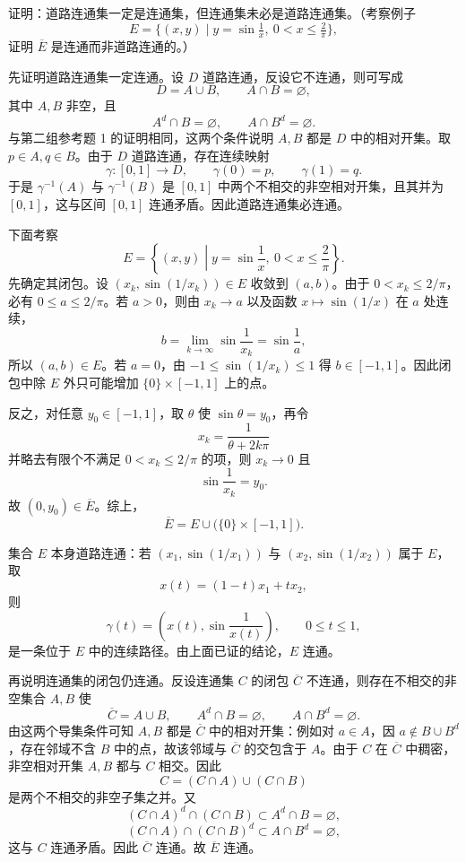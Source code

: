\begin{xreferenceproblem}[5]
证明：道路连通集一定是连通集，但连通集未必是道路连通集。（考察例子
  \[
    E=\{(x,y)\mid y=\sin\tfrac1x,\ 0<x\leq\tfrac2\pi\},
  \]
  证明 $\overline E$ 是连通而非道路连通的。）
\end{xreferenceproblem}
\begin{xsolution}
先证明道路连通集一定连通。设 $D$ 道路连通，反设它不连通，则可写成
\[
  D=A\cup B,
  \qquad A\cap B=\varnothing,
\]
其中 $A,B$ 非空，且
\[
  A^d\cap B=\varnothing,
  \qquad
  A\cap B^d=\varnothing.
\]
与第二组参考题 1 的证明相同，这两个条件说明 $A,B$ 都是 $D$ 中的相对开集。取 $p\in A,q\in B$。由于 $D$ 道路连通，存在连续映射
\[
  \gamma\colon[0,1]\to D,
  \qquad \gamma(0)=p,
  \qquad \gamma(1)=q.
\]
于是 $\gamma^{-1}(A)$ 与 $\gamma^{-1}(B)$ 是 $[0,1]$ 中两个不相交的非空相对开集，且其并为 $[0,1]$，这与区间 $[0,1]$ 连通矛盾。因此道路连通集必连通。

下面考察
\[
  E=\left\{(x,y)\middle|y=\sin\frac1x,\ 0<x\leq\frac2\pi\right\}.
\]
先确定其闭包。设 $(x_k,\sin(1/x_k))\in E$ 收敛到 $(a,b)$。由于 $0<x_k\leq2/\pi$，必有 $0\leq a\leq2/\pi$。若 $a>0$，则由 $x_k\to a$ 以及函数 $x\mapsto\sin(1/x)$ 在 $a$ 处连续，
\[
  b=\lim_{k\to\infty}\sin\frac1{x_k}=\sin\frac1a,
\]
所以 $(a,b)\in E$。若 $a=0$，由 $-1\leq\sin(1/x_k)\leq1$ 得 $b\in[-1,1]$。因此闭包中除 $E$ 外只可能增加 $\{0\}\times[-1,1]$ 上的点。

反之，对任意 $y_0\in[-1,1]$，取 $\theta$ 使 $\sin\theta=y_0$，再令
\[
  x_k=\frac1{\theta+2k\pi}
\]
并略去有限个不满足 $0<x_k\leq2/\pi$ 的项，则 $x_k\to0$ 且
\[
  \sin\frac1{x_k}=y_0.
\]
故 $(0,y_0)\in\overline E$。综上，
\[
  \overline E
  =E\cup\bigl(\{0\}\times[-1,1]\bigr).
\]

集合 $E$ 本身道路连通：若 $(x_1,\sin(1/x_1))$ 与 $(x_2,\sin(1/x_2))$ 属于 $E$，取
\[
  x(t)=(1-t)x_1+tx_2,
\]
则
\[
  \gamma(t)=\left(x(t),\sin\frac1{x(t)}\right),\qquad 0\leq t\leq1,
\]
是一条位于 $E$ 中的连续路径。由上面已证的结论，$E$ 连通。

再说明连通集的闭包仍连通。反设连通集 $C$ 的闭包 $\overline C$ 不连通，则存在不相交的非空集合 $A,B$ 使
\[
  \overline C=A\cup B,
  \qquad A^d\cap B=\varnothing,
  \qquad A\cap B^d=\varnothing.
\]
由这两个导集条件可知 $A,B$ 都是 $\overline C$ 中的相对开集：例如对 $a\in A$，因 $a\notin B\cup B^d$，存在邻域不含 $B$ 中的点，故该邻域与 $\overline C$ 的交包含于 $A$。由于 $C$ 在 $\overline C$ 中稠密，非空相对开集 $A,B$ 都与 $C$ 相交。因此
\[
  C=(C\cap A)\cup(C\cap B)
\]
是两个不相交的非空子集之并。又
\[
  (C\cap A)^d\cap(C\cap B)\subset A^d\cap B=\varnothing,
\]
\[
  (C\cap A)\cap(C\cap B)^d\subset A\cap B^d=\varnothing,
\]
这与 $C$ 连通矛盾。因此 $\overline C$ 连通。故 $\overline E$ 连通。


\end{xsolution}
